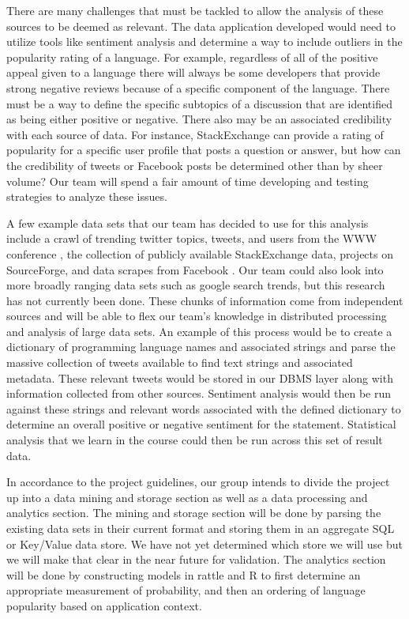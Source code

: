 \documentclass{sig-alternate}
\begin{document}
There are many challenges that must be tackled to allow the analysis of these sources to be deemed as relevant. The data application developed would need to utilize tools like sentiment analysis and determine a way to include outliers in the popularity rating of a language. For example, regardless of all of the positive appeal given to a language there will always be some developers that provide strong negative reviews because of a specific component of the language. There must be a way to define the specific subtopics of a discussion that are identified as being either positive or negative. There also may be an associated credibility with each source of data. For instance, StackExchange can provide a rating of popularity for a specific user profile that posts a question or answer, but how can the credibility of tweets or Facebook posts be determined other than by sheer volume? Our team will spend a fair amount of time developing and testing strategies to analyze these issues. 

A few example data sets that our team has decided to use for this analysis include a crawl of trending twitter topics, tweets, and users from the WWW conference \cite{Kwak10www}, the collection of publicly available StackExchange data, projects on SourceForge, and data scrapes from Facebook \cite{FBCrawl}. Our team could also look into more broadly ranging data sets such as google search trends, but this research has not currently been done.  These chunks of information come from independent sources and will be able to flex our team’s knowledge in distributed processing and analysis of large data sets. An example of this process would be to create a dictionary of programming language names and associated strings and parse the massive collection of tweets available to find text strings and associated metadata. These relevant tweets would be stored in our DBMS layer along with information collected from other sources. Sentiment analysis would then be run against these strings and relevant words associated with the defined dictionary to determine an overall positive or negative sentiment for the statement. Statistical analysis that we learn in the course could then be run across this set of result data. 

In accordance to the project guidelines, our group intends to divide the project up into a data mining and storage section as well as a data processing and analytics section. The mining and storage section will be done by parsing the existing data sets in their current format and storing them in an aggregate SQL or Key/Value data store. We have not yet determined which store we will use but we will make that clear in the near future for validation. The analytics section will be done by constructing models in rattle and R to first determine an appropriate measurement of probability, and then an ordering of language popularity based on application context.
\end{document}
